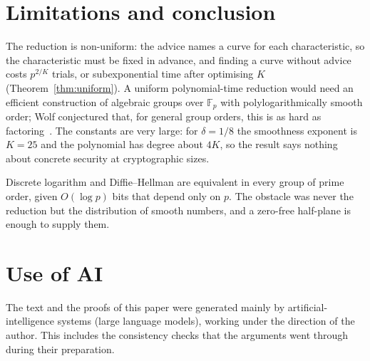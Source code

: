 \documentclass[11pt]{article}
\theoremstyle{remark}
\newcommand{\F}{\mathbb{F}}
\begin{document}






\section{Limitations and conclusion}\label{sec:conclusion}
The reduction is non-uniform: the advice names a curve for each characteristic, so the characteristic must
be fixed in advance, and finding a curve without advice costs $p^{2/K}$ trials, or subexponential time after
optimising $K$ (Theorem~\ref{thm:uniform}). A uniform polynomial-time reduction would need an efficient
construction of algebraic groups over $\F_p$ with polylogarithmically smooth order; Wolf conjectured that,
for general group orders, this is as hard as factoring~\cite[Conj.~10.1]{Wol99}. The constants are very
large: for $\delta=1/8$ the smoothness exponent is $K=25$ and the polynomial has degree about $4K$, so the
result says nothing about concrete security at cryptographic sizes.

Discrete logarithm and Diffie--Hellman are equivalent in every group of prime order, given $O(\log p)$ bits
that depend only on $p$. The obstacle was never the reduction but the distribution of smooth numbers, and a
zero-free half-plane is enough to supply them.

\section*{Use of AI}
The text and the proofs of this paper were generated mainly by artificial-intelligence systems (large
language models), working under the direction of the author. This includes the consistency checks that the
arguments went through during their preparation.

\appendix




\end{document}
